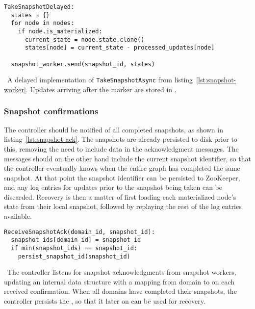 \begin{listing}[H]
  \begin{verbatim}
TakeSnapshotDelayed:
  states = {}
  for node in nodes:
    if node.is_materialized:
      current_state = node.state.clone()
      states[node] = current_state - processed_updates[node]

  snapshot_worker.send(snapshot_id, states)
  \end{verbatim}
  \caption{\
    A delayed implementation of \texttt{TakeSnapshotAsync} from
    listing~\ref{lst:snapshot-worker}. Updates arriving after the marker are
    stored in \code{processed\_updates}.
  }
\end{listing}

\subsubsection{Snapshot confirmations}

The controller should be notified of all completed snapshots, as shown in
listing~\ref{lst:snapshot-ack}. The snapshots are already persisted to disk
prior to this, removing the need to include data in the acknowledgment messages.
The messages should on the other hand include the current snapshot identifier,
so that the controller eventually knows when the entire graph has completed the
same snapshot. At that point the snapshot identifier can be persisted to
ZooKeeper, and any log entries for updates prior to the snapshot being taken can
be discarded. Recovery is then a matter of first loading each materialized
node's state from their local snapshot, followed by replaying the rest of the
log entries available.

\begin{listing}[H]
  \begin{verbatim}
ReceiveSnapshotAck(domain_id, snapshot_id):
  snapshot_ids[domain_id] = snapshot_id
  if min(snapshot_ids) == snapshot_id:
    persist_snapshot_id(snapshot_id)
  \end{verbatim}
  \caption{\
    The controller listens for snapshot acknowledgments from snapshot workers,
    updating an internal data structure with a mapping from domain to
     on each received confirmation. When all domains have
    completed their snapshots, the controller persists the
    \code{snapshot\_id}, so that it later on can be used for recovery.
  }\label{snapshot_acks}
\end{listing}


